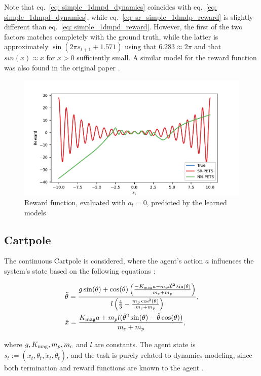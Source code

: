 \documentclass[11pt]{article}
\begin{document}
Note that eq.~\eqref{eq: simple_1dmpd_dynamics} coincides with eq.~\eqref{eq: simple_1dmpd_dynamics}, while eq.~\eqref{eq: sr_simple_1dmdp_reward} is slightly different than eq.~\eqref{eq: simple_1dmpd_reward}. However, the first of the two factors matches completely with the ground truth, while the latter is approximately $\sin(2\pi s_{t+1} + 1.571)$ using that $6.283\approx 2\pi$ and that $sin(x) \approx x$ for $x>0$ sufficiently small. A similar model for the reward function was also found in the original paper \cite{kamienny2022symbolic}.

\begin{figure}
	\centering
	\includegraphics{simple1dmdp_pets.pdf}
	\caption{Reward function, evaluated with $a_t=0$, predicted by the learned models}
	\label{fig: simple_1dmdp}
\end{figure}

\subsection{Cartpole}
The continuous Cartpole \cite{brockman2016openai, todorov2012mujoco} is considered, where the agent's action $a$ influences the system's state based on the following equations \cite{florian2007correct}:

\begin{align}
	&\ddot{\theta} = \frac{g\sin(\theta) + \cos(\theta)\left(\frac{-K_{\rm mag} a - m_p l \dot{\theta}^2\sin(\theta)}{m_c + m_p}\right)}{l\left(\frac{4}{3} - \frac{m_p\cos^2(\theta)}{m_c+m_p}\right)}, \label{eq: cartpole_theta}\\
	& \ddot{x} = \frac{K_{\rm mag} a + m_pl(\dot{\theta}^2\sin(\theta) - \ddot{\theta}\cos(\theta))}{m_c + m_p} \label{eq: cartpole_x},
\end{align}

where $g,K_{\rm mag}, m_p, m_c$ and $l$ are constants. The agent state is $s_t := (x_t, \theta_t, \dot{x}_t, \dot{\theta}_t)$, and the task is purely related to dynamics modeling, since both termination and reward functions are known to the agent \cite{pineda2021mbrl, chua2018deep}. 
\end{document}

